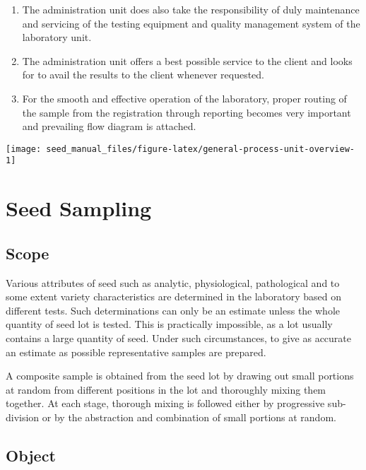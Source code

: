 \documentclass[
]{book}
\begin{document}
\begin{enumerate}
\item
  The administration unit does also take the responsibility of duly maintenance and servicing of the testing equipment and quality management system of the laboratory unit.
\item
  The administration unit offers a best possible service to the client and looks for to avail the results to the client whenever requested.
\item
  For the smooth and effective operation of the laboratory, proper routing of the sample from the registration through reporting becomes very important and prevailing flow diagram is attached.
\end{enumerate}

\begin{center}\texttt{[image: seed\_manual\_files/figure-latex/general-process-unit-overview-1]} \end{center}

\hypertarget{seed-sampling}{%
\chapter{Seed Sampling}\label{seed-sampling}}

\hypertarget{scope}{%
\section{Scope}\label{scope}}

Various attributes of seed such as analytic, physiological, pathological and to some extent variety characteristics are determined in the laboratory based on different tests. Such determinations can only be an estimate unless the whole quantity of seed lot is tested. This is practically impossible, as a lot usually contains a large quantity of seed. Under such circumstances, to give as accurate an estimate as possible representative samples are prepared.

A composite sample is obtained from the seed lot by drawing out small portions at random from different positions in the lot and thoroughly mixing them together. At each stage, thorough mixing is followed either by progressive sub-division or by the abstraction and combination of small portions at random.

\hypertarget{object}{%
\section{Object}\label{object}}
\end{document}
